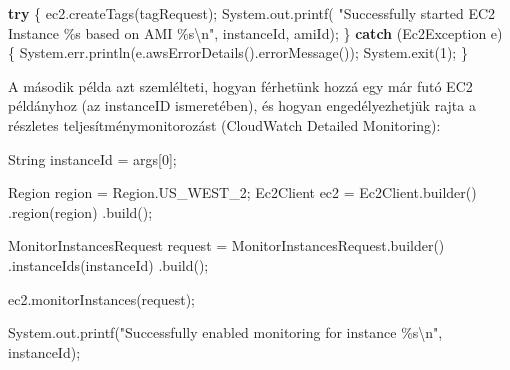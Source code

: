\documentclass[
]{article}
\newenvironment{Shaded}{}{}
\newcommand{\BuiltInTok}[1]{\textcolor[rgb]{0.00,0.50,0.00}{#1}}
\newcommand{\ControlFlowTok}[1]{\textcolor[rgb]{0.00,0.44,0.13}{\textbf{#1}}}
\newcommand{\DecValTok}[1]{\textcolor[rgb]{0.25,0.63,0.44}{#1}}
\newcommand{\FunctionTok}[1]{\textcolor[rgb]{0.02,0.16,0.49}{#1}}
\newcommand{\NormalTok}[1]{#1}
\newcommand{\OperatorTok}[1]{\textcolor[rgb]{0.40,0.40,0.40}{#1}}
\newcommand{\SpecialCharTok}[1]{\textcolor[rgb]{0.25,0.44,0.63}{#1}}
\newcommand{\StringTok}[1]{\textcolor[rgb]{0.25,0.44,0.63}{#1}}
\begin{document}
\begin{Shaded}
\begin{Highlighting}[]
\ControlFlowTok{try} \OperatorTok{\{}
\NormalTok{    ec2}\OperatorTok{.}\FunctionTok{createTags}\OperatorTok{(}\NormalTok{tagRequest}\OperatorTok{);}
    \BuiltInTok{System}\OperatorTok{.}\FunctionTok{out}\OperatorTok{.}\FunctionTok{printf}\OperatorTok{(}
           \StringTok{"Successfully started EC2 Instance }\SpecialCharTok{\%s}\StringTok{ based on AMI }\SpecialCharTok{\%s\textbackslash{}n}\StringTok{"}\OperatorTok{,}
\NormalTok{           instanceId}\OperatorTok{,}\NormalTok{ amiId}\OperatorTok{);}
\OperatorTok{\}} \ControlFlowTok{catch} \OperatorTok{(}\NormalTok{Ec2Exception e}\OperatorTok{)} \OperatorTok{\{}
    \BuiltInTok{System}\OperatorTok{.}\FunctionTok{err}\OperatorTok{.}\FunctionTok{println}\OperatorTok{(}\NormalTok{e}\OperatorTok{.}\FunctionTok{awsErrorDetails}\OperatorTok{().}\FunctionTok{errorMessage}\OperatorTok{());}
    \BuiltInTok{System}\OperatorTok{.}\FunctionTok{exit}\OperatorTok{(}\DecValTok{1}\OperatorTok{);}
\OperatorTok{\}}
\end{Highlighting}
\end{Shaded}

A második példa azt szemlélteti, hogyan férhetünk hozzá egy már futó EC2
példányhoz (az instanceID ismeretében), és hogyan engedélyezhetjük rajta
a részletes teljesítménymonitorozást (CloudWatch Detailed Monitoring):

\begin{Shaded}
\begin{Highlighting}[]
\BuiltInTok{String}\NormalTok{ instanceId }\OperatorTok{=}\NormalTok{ args}\OperatorTok{[}\DecValTok{0}\OperatorTok{];}

\BuiltInTok{Region}\NormalTok{ region }\OperatorTok{=} \BuiltInTok{Region}\OperatorTok{.}\FunctionTok{US\_WEST\_2}\OperatorTok{;}
\NormalTok{Ec2Client ec2 }\OperatorTok{=}\NormalTok{ Ec2Client}\OperatorTok{.}\FunctionTok{builder}\OperatorTok{()}
        \OperatorTok{.}\FunctionTok{region}\OperatorTok{(}\NormalTok{region}\OperatorTok{)}
        \OperatorTok{.}\FunctionTok{build}\OperatorTok{();}

\NormalTok{MonitorInstancesRequest request }\OperatorTok{=}\NormalTok{ MonitorInstancesRequest}\OperatorTok{.}\FunctionTok{builder}\OperatorTok{()}
        \OperatorTok{.}\FunctionTok{instanceIds}\OperatorTok{(}\NormalTok{instanceId}\OperatorTok{)}
        \OperatorTok{.}\FunctionTok{build}\OperatorTok{();}

\NormalTok{ec2}\OperatorTok{.}\FunctionTok{monitorInstances}\OperatorTok{(}\NormalTok{request}\OperatorTok{);}

\BuiltInTok{System}\OperatorTok{.}\FunctionTok{out}\OperatorTok{.}\FunctionTok{printf}\OperatorTok{(}\StringTok{"Successfully enabled monitoring for instance }\SpecialCharTok{\%s\textbackslash{}n}\StringTok{"}\OperatorTok{,}
\NormalTok{                    instanceId}\OperatorTok{);}
\end{Highlighting}
\end{Shaded}
\end{document}
